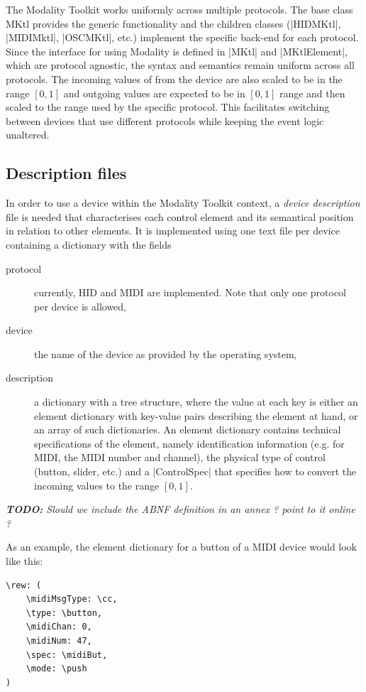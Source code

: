\documentclass{article}
\newcommand{\todo}[1] {\emph{\textbf{TODO:} #1}}
\begin{document}
The Modality Toolkit works uniformly across multiple protocols. The base class MKtl provides the generic functionality and the children classes (|HIDMKtl|, |MIDIMktl|, |OSCMKtl|, etc.) implement the specific back-end for each protocol. Since the interface for using Modality is defined in |MKtl| and |MKtlElement|, which are protocol agnostic, the syntax and semantics remain uniform across all protocols. The incoming values of from the device are also scaled to be in the range $[0,1]$ and outgoing values are expected to be in $[0,1]$ range and then scaled to the range used by the specific protocol. This facilitates switching between devices that use different protocols while keeping the event logic unaltered.

\subsection{Description files}
\label{sub:descriptions_files}

In order to use a device within the Modality Toolkit context, a \textit{device description} file is needed that characterises each control element and its semantical position in relation to other elements.
It is implemented using one text file per device containing a dictionary with the fields 
\begin{description}
	\item[protocol] currently, HID and MIDI are implemented. Note that only one protocol per device is allowed,
	\item[device] the name of the device as provided by the operating system,
	\item[description] a dictionary with a tree structure, where the value at each key is either an element dictionary with key-value pairs describing the element at hand, or an array of such dictionaries.
	An element dictionary contains technical specifications of the element, namely identification information (e.g. for MIDI, the MIDI number and channel), the physical type of control (button, slider, etc.) and a |ControlSpec| that specifies how to convert the incoming values to the range $[0,1]$.
\end{description}

\todo{Slould we include the ABNF definition  in an annex ? point to it online ?} 
   
As an example, the element dictionary for a button of a MIDI device would look like this:
\begin{Verbatim}
\rew: (
	\midiMsgType: \cc,
	\type: \button,
	\midiChan: 0,
	\midiNum: 47,
	\spec: \midiBut,
	\mode: \push
)
\end{Verbatim}
\end{document}

